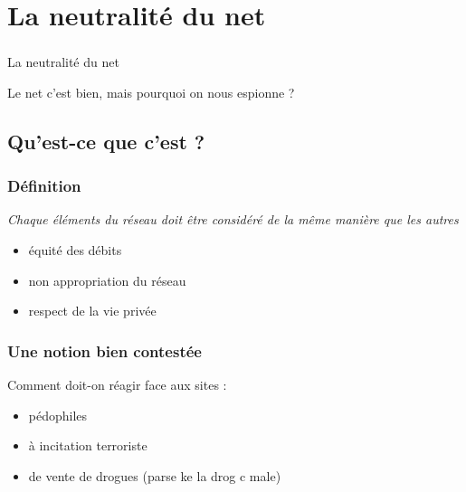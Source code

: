 

\section{La neutralité du net}
\begin{frame}\frametitle{}
    {\Huge La neutralité du net}

    \vspace{2em}

    Le net c'est bien, mais pourquoi on nous espionne ?
\end{frame}


\subsection{Qu'est-ce que c'est ?}
\begin{frame}\frametitle{Définition}
    \emph{Chaque éléments du réseau doit être considéré de la même manière que
    les autres}

    \vspace{1em}

    \begin{itemize}
        \item équité des débits
        \item non appropriation du réseau
        \item respect de la vie privée
    \end{itemize}
\end{frame}


\begin{frame}\frametitle{Une notion bien contestée}
    Comment doit-on réagir face aux sites :
    \begin{itemize}
        \item pédophiles
        \item à incitation terroriste
        \item de vente de drogues (parse ke la drog c male)
    \end{itemize}
\end{frame}


